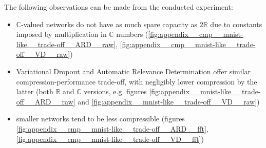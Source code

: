 \documentclass[a4paper,10pt]{article}
\newcommand{\real}{\mathbb{R}}
\newcommand{\cplx}{\mathbb{C}}
\begin{document}
The following observations can be made from the conducted experiment:
\begin{itemize}
  \item $\cplx$-valued networks do not have as much spare capacity as $2 \real$ due to
  constants imposed by multiplication in $\cplx$ numbers (\ref{fig:appendix__cmp__mnist-like__trade-off__ARD__raw},
  \ref{fig:appendix__cmp__mnist-like__trade-off__VD__raw})
  \item Variational Dropout and Automatic Relevance Determination offer similar compression-performance
  trade-off, with negligibly lower compression by the latter (both $\real$ and $\cplx$ versions,
  e.g. figures \ref{fig:appendix__mnist-like__trade-off__ARD__raw} and \ref{fig:appendix__mnist-like__trade-off__VD__raw})
  \item smaller networks tend to be less compressible (figures \ref{fig:appendix__cmp__mnist-like__trade-off__ARD__fft},
  \ref{fig:appendix__cmp__mnist-like__trade-off__VD__fft})
\end{itemize}
\end{document}
